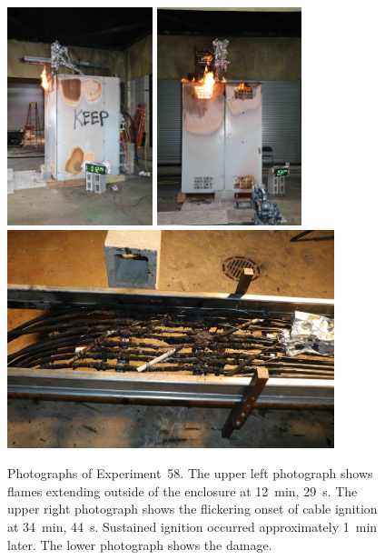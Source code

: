 \begin{figure}[p]
\centering
\includegraphics[height=2.50in,angle=-90]{../FIGURES/Test_58_12_min_29_s}  \hspace{0.1in}
\includegraphics[height=2.50in,angle=-90]{../FIGURES/Test_58_34_min_44_s} \\  \vspace{0.1in}
\includegraphics[height=2.50in]{../FIGURES/Test_58_scar}
\caption[Photographs of Experiment~58]{Photographs of Experiment~58. The upper left photograph shows flames extending outside of the enclosure at 12~min, 29~s. The upper right photograph shows the flickering onset of cable ignition at 34~min, 44~s. Sustained ignition occurred approximately 1~min later. The lower photograph shows the damage.}
\label{fig:Test_58_photos}
\end{figure}


